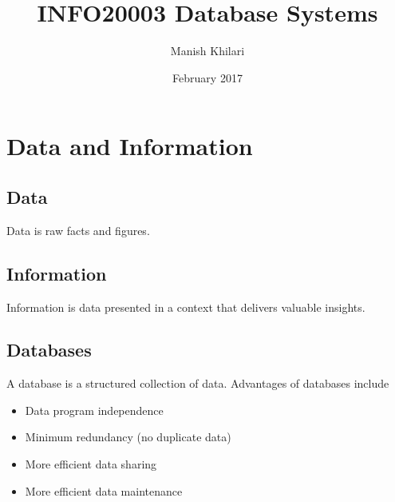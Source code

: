 \documentclass[12pt, a4paper]{article}
\title{INFO20003 Database Systems}
\author{Manish Khilari}
\date{February 2017}
\begin{document}
    
    \maketitle

    \section{Data and Information}
    \subsection{Data}
    Data is raw facts and figures. 

    \subsection{Information}
    Information is data presented in a context that delivers valuable insights. 

    \subsection{Databases}
    A database is a structured collection of data.  
    Advantages of databases include 
    \begin{itemize}
        \item Data program independence 
        \item Minimum redundancy (no duplicate data) 
        \item More efficient data sharing 
        \item More efficient data maintenance 
    \end{itemize}
\end{document}
